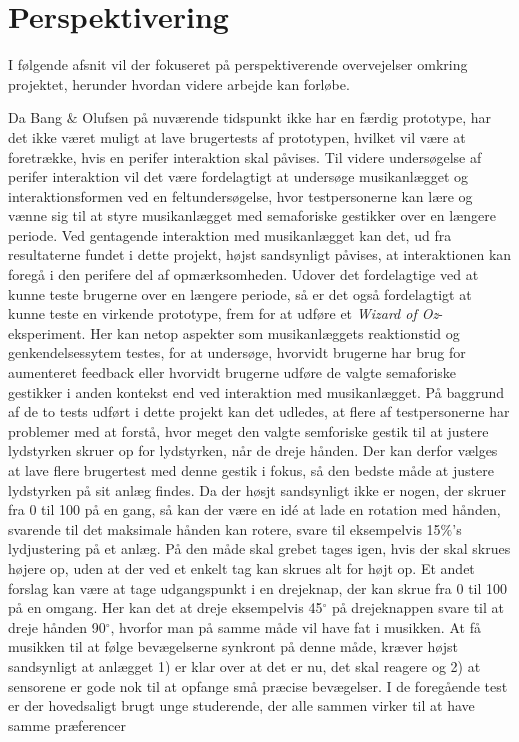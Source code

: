 \chapter{Perspektivering}
\label{Perspektivering}
%
I følgende afsnit vil der fokuseret på perspektiverende overvejelser omkring projektet, herunder hvordan videre arbejde kan forløbe.

Da Bang $\&$ Olufsen på nuværende tidspunkt ikke har en færdig prototype, har det ikke været muligt at lave brugertests af prototypen, hvilket vil være at foretrække, hvis en perifer interaktion skal påvises. Til videre undersøgelse af perifer interaktion vil det være fordelagtigt at undersøge musikanlægget og interaktionsformen ved en feltundersøgelse, hvor testpersonerne kan lære og vænne sig til at styre musikanlægget med semaforiske gestikker over en længere periode. Ved gentagende interaktion med musikanlægget kan det, ud fra resultaterne fundet i dette projekt, højst sandsynligt påvises, at interaktionen kan foregå i den perifere del af opmærksomheden. Udover det fordelagtige ved at kunne teste brugerne over en længere periode, så er det også fordelagtigt at kunne teste en virkende prototype, frem for at udføre et \textit{Wizard of Oz}-eksperiment. Her kan netop aspekter som musikanlæggets reaktionstid og genkendelsessytem testes, for at undersøge, hvorvidt brugerne har brug for aumenteret feedback eller hvorvidt brugerne udføre de valgte semaforiske gestikker i anden kontekst end ved interaktion med musikanlægget.\blankline
%
På baggrund af de to tests udført i dette projekt kan det udledes, at flere af testpersonerne har problemer med at forstå, hvor meget den valgte semforiske gestik til at justere lydstyrken skruer op for lydstyrken, når de dreje hånden. Der kan derfor vælges at lave flere brugertest med denne gestik i fokus, så den bedste måde at justere lydstyrken på sit anlæg findes. Da der høsjt sandsynligt ikke er nogen, der skruer fra 0 til 100 på en gang, så kan der være en idé at lade en rotation med hånden, svarende til det maksimale hånden kan rotere, svare til eksempelvis 15$\%$'s lydjustering på et anlæg. På den måde skal grebet tages igen, hvis der skal skrues højere op, uden at der ved et enkelt tag kan skrues alt for højt op. Et andet forslag kan være at tage udgangspunkt i en drejeknap, der kan skrue fra 0 til 100 på en omgang. Her kan det at dreje eksempelvis 45$^{\circ}$ på drejeknappen svare til at dreje hånden 90$^{\circ}$, hvorfor man på samme måde vil have fat i musikken. At få musikken til at følge bevægelserne synkront på denne måde, kræver højst sandsynligt at anlægget 1) er klar over at det er nu, det skal reagere og 2) at sensorene er gode nok til at opfange små præcise bevægelser.\blankline
%
I de foregående test er der hovedsaligt brugt unge studerende, der alle sammen virker til at have samme præferencer 



